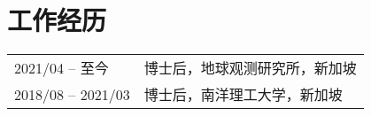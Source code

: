 \section*{工作经历}
\begin{tabular}{p{} p{}}
2021/04 -- 至今 & 博士后，地球观测研究所，新加坡 \\
2018/08 -- 2021/03 & 博士后，南洋理工大学，新加坡 \\
\end{tabular}
